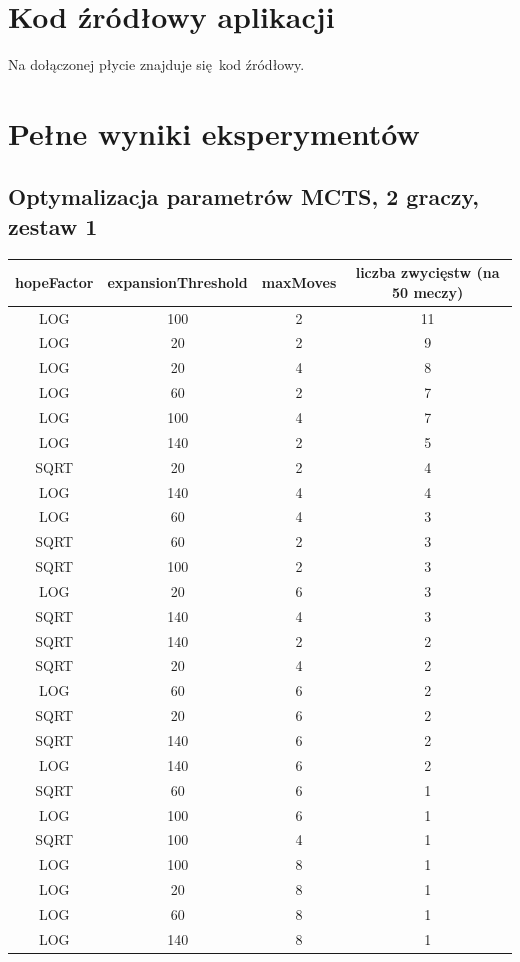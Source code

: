 \documentclass{pracamgr}
\begin{document}
\begin{appendices}

\chapter{Kod źródłowy aplikacji}
Na dołączonej płycie znajduje się kod źródłowy.

\chapter{Pełne wyniki eksperymentów}

\section{Optymalizacja parametrów MCTS, 2 graczy, zestaw 1\label{results-1-2p}}

\begin{center}
    \begin{tabular}{| c | c | c | c |}
	\hline
    hopeFactor & expansionThreshold & maxMoves & liczba zwycięstw (na 50 meczy) \\ \hline
	\hline
        LOG & 100 & 2 & 11 \\ \hline
        LOG & 20 & 2 & 9 \\ \hline
        LOG & 20 & 4 & 8 \\ \hline
        LOG & 60 & 2 & 7 \\ \hline
        LOG & 100 & 4 & 7 \\ \hline
        LOG & 140 & 2 & 5 \\ \hline
        SQRT & 20 & 2 & 4 \\ \hline
        LOG & 140 & 4 & 4 \\ \hline
        LOG & 60 & 4 & 3 \\ \hline
        SQRT & 60 & 2 & 3 \\ \hline
        SQRT & 100 & 2 & 3 \\ \hline
        LOG & 20 & 6 & 3 \\ \hline
        SQRT & 140 & 4 & 3 \\ \hline
        SQRT & 140 & 2 & 2 \\ \hline
        SQRT & 20 & 4 & 2 \\ \hline
        LOG & 60 & 6 & 2 \\ \hline
        SQRT & 20 & 6 & 2 \\ \hline
        SQRT & 140 & 6 & 2 \\ \hline
        LOG & 140 & 6 & 2 \\ \hline
        SQRT & 60 & 6 & 1 \\ \hline
        LOG & 100 & 6 & 1 \\ \hline
        SQRT & 100 & 4 & 1 \\ \hline
        LOG & 100 & 8 & 1 \\ \hline
        LOG & 20 & 8 & 1 \\ \hline
        LOG & 60 & 8 & 1 \\ \hline
        LOG & 140 & 8 & 1 \\ \hline
    \end{tabular}
\end{center}


\end{appendices}
\end{document}
